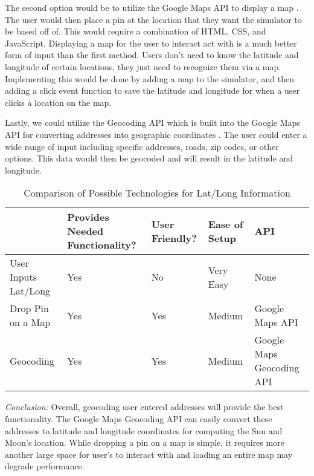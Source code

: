\documentclass[10pt, onecolumn, draftclsnofoot, letterpaper, compsoc]{IEEEtran}
\begin{document}
The second option would be to utilize the Google Maps API to display a map
\cite{jsAPI}.
The user would then place a pin at the location that they want the simulator
to be based off of. This would require a combination of HTML, CSS, and
JavaScript. Displaying a map for the user to interact act with is a much
better form of input than the first method. Users don’t need to know the
latitude and longitude of certain locations, they just need to recognize
them via a map. Implementing this would be done by adding a map to the
simulator, and then adding a click event function to save the latitude and
longitude for when a user clicks a location on the map.

Lastly, we could utilize the Geocoding API which is built into the Google Maps
API for converting addresses into geographic coordinates \cite{jsGEO}.
The user could enter a wide range of input including specific addresses,
roads, zip codes, or other options. This data would then be geocoded and will
result in the latitude and longitude.

\begin{table}[h]
\centering
\caption{Comparison of Possible Technologies for Lat/Long Information}
\begin{tabular}{|p{3.15cm}|p{3.15cm}|p{3.15cm}|p{3.15cm}|p{3.15cm}|}
\cline{5-4}

\hline  & Provides Needed Functionality? & User Friendly? & Ease of Setup
 & API \\ \hline

User Inputs Lat/Long & Yes & No & Very Easy & None \\ \hline

Drop Pin on a Map & Yes & Yes & Medium & Google Maps API \\ \hline

Geocoding & Yes & Yes & Medium & Google Maps Geocoding API \\ \hline

\end{tabular}
\label{table:Jake2}
\end{table}

\textit{Conclusion:} Overall, geocoding user entered addresses will provide the
best functionality. The Google Maps Geocoding API can easily convert these
addresses to latitude and longitude coordinates for computing the Sun and
Moon's location. While dropping a pin on a map is simple, it requires more
another large space for user’s to interact with and loading an entire
map may degrade performance.
\end{document}
